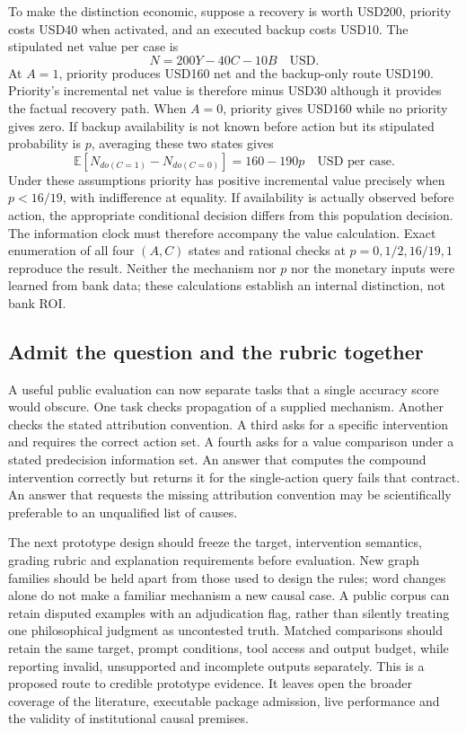 To make the distinction economic, suppose a recovery is worth USD200,
priority costs USD40 when activated, and an executed backup costs USD10.
The stipulated net value per case is
\begin{equation}
 N=200Y-40C-10B\quad\text{USD}.
 \label{exec18:reasoning-money}
\end{equation}
At $A=1$, priority produces USD160 net and the backup-only route USD190.
Priority's incremental net value is therefore minus USD30 although it
provides the factual recovery path. When $A=0$, priority gives USD160 while
no priority gives zero. If backup availability is not known before action
but its stipulated probability is $p$, averaging these two states gives
\begin{equation}
 \mathbb{E}[N_{do(C=1)}-N_{do(C=0)}]
 =160-190p\quad\text{USD per case}.
 \label{exec18:reasoning-threshold}
\end{equation}
Under these assumptions priority has positive incremental value precisely
when $p<16/19$, with indifference at equality. If availability is actually
observed before action, the appropriate conditional decision differs from
this population decision. The information clock must therefore accompany
the value calculation. Exact enumeration of all four $(A,C)$ states and
rational checks at $p=0,1/2,16/19,1$ reproduce the result. Neither the
mechanism nor $p$ nor the monetary inputs were learned from bank data; these
calculations establish an internal distinction, not bank ROI.~\citep{exec18_reasoning_reference}

\subsection{Admit the question and the rubric together}
A useful public evaluation can now separate tasks that a single accuracy
score would obscure. One task checks propagation of a supplied mechanism.
Another checks the stated attribution convention. A third asks for a
specific intervention and requires the correct action set. A fourth asks
for a value comparison under a stated predecision information set. An
answer that computes the compound intervention correctly but returns it for
the single-action query fails that contract. An answer that requests the
missing attribution convention may be scientifically preferable to an
unqualified list of causes.

The next prototype design should freeze the target, intervention semantics,
grading rubric and explanation requirements before evaluation. New graph
families should be held apart from those used to design the rules; word
changes alone do not make a familiar mechanism a new causal case. A public
corpus can retain disputed examples with an adjudication flag, rather than
silently treating one philosophical judgment as uncontested truth. Matched
comparisons should retain the same target, prompt conditions, tool access
and output budget, while reporting invalid, unsupported and incomplete
outputs separately. This is a proposed route to credible prototype evidence.
It leaves open the broader coverage of the literature, executable package
admission, live performance and the validity of institutional causal premises.
